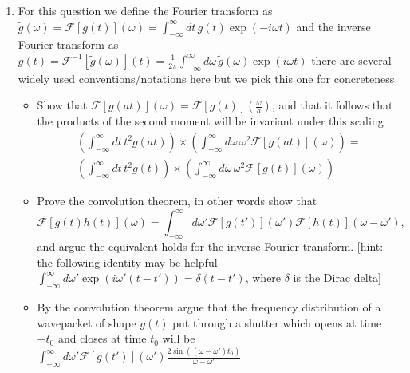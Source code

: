 \documentclass[english]{article}
\begin{document}
\begin{enumerate}
\begin{itemize}
\begin{equation}
\frac{\partial \hat{\rho}}{\partial t}=-\frac{i}{\hbar}\left[\hat{\rho}, \hat{H}\right]+\sum_j\gamma_j\left(\hat{L}_j\hat{\rho}\hat{L}_j^\dagger-\frac{1}{2}\hat{L}_j^\dagger \hat{L}_j\hat{\rho}-\frac{1}{2}\hat{\rho}\hat{L}_j^\dagger \hat{L}_j\right)
\end{equation}
 what property of $\hat{H}$, $\hat{L}_j$, and $\gamma_j\ge 0$  is sufficient to guarantee that the measurement value is unchanged? How could this be ensured if we are allowed completely a general $\hat{O}$ in $\hat{O}_A=\hat{O}\otimes 1_B$?  what does this mean physically?
\end{itemize}
\item For this question we define the Fourier transform as $\tilde{g}(\omega)=\mathcal{F}[g(t)](\omega)= \int_{-\infty}^\infty dt\, g(t)\exp(-i\omega t)$ and the inverse Fourier transform as $g(t)=\mathcal{F}^{-1}[\tilde{g}(\omega)](t)=\frac{1}{2\pi} \int_{-\infty}^\infty d\omega\, \tilde{g}(\omega)\exp(i\omega t)$ there are several widely used conventions/notations here but we pick this one for concreteness
\begin{itemize}
\item Show that $\mathcal{F}[g(a t)](\omega)=\mathcal{F}[g(t)](\frac{\omega}{a})$, and that it follows that the products of the second moment will be invariant under this scaling
\begin{align}
\left(\int_{-\infty}^{\infty}dt\, t^2 g(a t)\right)\times \left(\int_{-\infty}^{\infty}d\omega\,\omega^2 \mathcal{F}[g(a t)](\omega) \right)=\\
\left(\int_{-\infty}^{\infty}dt\, t^2 g(t)\right)\times \left(\int_{-\infty}^{\infty}d\omega\,\omega^2 \mathcal{F}[g(t)](\omega) \right)
\end{align}
\item Prove the convolution theorem, in other words show that 
\begin{equation}
\mathcal{F}[g(t)h(t)](\omega)=\int_{-\infty}^\infty d\omega' \mathcal{F}[g(t')](\omega')\mathcal{F}[h(t)](\omega-\omega'),
\end{equation}
 and argue the equivalent holds for the inverse Fourier transform. [hint: the following identity may be helpful $ \int_{-\infty}^\infty d\omega'  \exp(i\omega'(t-t'))=\delta(t-t')$, where $\delta$ is the Dirac delta]
\item By the convolution theorem argue that the frequency distribution of a wavepacket of shape $g(t)$ put through a shutter which opens at time $-t_0$ and closes at time $t_0$ will be $\int_{-\infty}^\infty d\omega'\mathcal{F}[g(t')](\omega') \frac{2\sin((\omega-\omega') t_0)}{\omega-\omega'}$

\end{itemize}
\end{enumerate}
\end{document}
